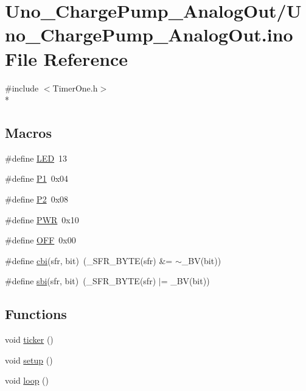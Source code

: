 \hypertarget{Uno__ChargePump__AnalogOut_8ino}{\section{Uno\-\_\-\-Charge\-Pump\-\_\-\-Analog\-Out/\-Uno\-\_\-\-Charge\-Pump\-\_\-\-Analog\-Out.ino File Reference}
\label{Uno__ChargePump__AnalogOut_8ino}
}
{\ttfamily \#include $<$Timer\-One.\-h$>$}\\*
\subsection*{Macros}
\begin{DoxyCompactItemize}
\item 
\#define \hyperlink{Uno__ChargePump__AnalogOut_8ino_aeb7a7ba1ab7e0406f1b5ab36d579f585}{L\-E\-D}~13
\item 
\#define \hyperlink{Uno__ChargePump__AnalogOut_8ino_a6c2a9f7efd46f0160f3037869924d6ce}{P1}~0x04
\item 
\#define \hyperlink{Uno__ChargePump__AnalogOut_8ino_ae00a52dba55d31948c377fa85d385b87}{P2}~0x08
\item 
\#define \hyperlink{Uno__ChargePump__AnalogOut_8ino_a04651c526497822a859942b928e57f8e}{P\-W\-R}~0x10
\item 
\#define \hyperlink{Uno__ChargePump__AnalogOut_8ino_a29e413f6725b2ba32d165ffaa35b01e5}{O\-F\-F}~0x00
\item 
\#define \hyperlink{Uno__ChargePump__AnalogOut_8ino_ae70baf5399951da1e7ad45a0ed890832}{cbi}(sfr, bit)~(\-\_\-\-S\-F\-R\-\_\-\-B\-Y\-T\-E(sfr) \&= $\sim$\-\_\-\-B\-V(bit))
\item 
\#define \hyperlink{Uno__ChargePump__AnalogOut_8ino_ac4a5536d9bf092116f88b94797ddc882}{sbi}(sfr, bit)~(\-\_\-\-S\-F\-R\-\_\-\-B\-Y\-T\-E(sfr) $\vert$= \-\_\-\-B\-V(bit))
\end{DoxyCompactItemize}
\subsection*{Functions}
\begin{DoxyCompactItemize}
\item 
void \hyperlink{Uno__ChargePump__AnalogOut_8ino_a6a015280c1363331ada8a329be6eb7c8}{ticker} ()
\item 
void \hyperlink{Uno__ChargePump__AnalogOut_8ino_a4fc01d736fe50cf5b977f755b675f11d}{setup} ()
\item 
void \hyperlink{Uno__ChargePump__AnalogOut_8ino_afe461d27b9c48d5921c00d521181f12f}{loop} ()
\end{DoxyCompactItemize}
